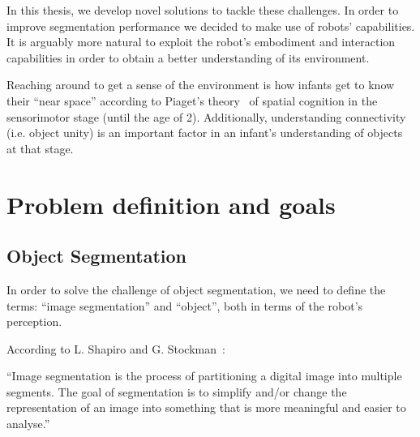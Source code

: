 In this thesis, we develop novel solutions to tackle these challenges.
In order to improve segmentation performance we decided to make use of robots'
capabilities. It is arguably more natural to exploit the robot's embodiment
and interaction capabilities in order to obtain a better understanding of its environment.

Reaching around to get a sense of the environment is how infants get to know their
``near space'' according to Piaget's theory~\cite{infants} of spatial cognition in the sensorimotor stage 
(until the age of 2). Additionally, understanding connectivity (i.e. object unity) is an important factor in an infant's understanding of objects at that stage.











\section{Problem definition and goals}

\subsection{Object Segmentation} 

In order to solve the challenge of object segmentation, we need to define the terms: ``image segmentation'' and ``object'', both in terms of the robot's perception. 


According to L. Shapiro and G. Stockman~\cite{shapiro2001computer}:

\noindent ``Image segmentation is the process of partitioning a digital image into multiple segments. The goal of segmentation is to simplify and/or change the representation of an image into something that is more meaningful and easier to analyse.''

